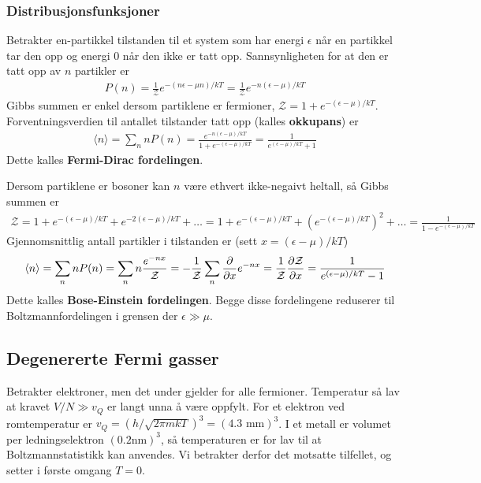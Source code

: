 \documentclass[12pt]{article}
\newcommand{\mean}[1]{\langle #1 \rangle}
\begin{document}
\subsubsection{Distribusjonsfunksjoner}
Betrakter en-partikkel tilstanden til et system som har energi $\epsilon$ når
en partikkel tar den opp og energi $0$ når den ikke er tatt opp. Sannsynligheten
for at den er tatt opp av $n$ partikler er
\begin{align*}
  P(n) = \frac{1}{\mathcal{Z}} e^{-(n\epsilon - \mu n)/kT} = \frac{1}{\mathcal{Z}} e^{-n(\epsilon - \mu)/kT}
\end{align*}
Gibbs summen er enkel dersom partiklene er fermioner, $\mathcal{Z} = 1 + e^{-(\epsilon - \mu)/kT}$.
Forventningsverdien til antallet tilstander tatt opp (kalles \textbf{okkupans}) er
\begin{align*}
  \mean{n} = \sum_n n P(n) = \frac{e^{-n(\epsilon - \mu)/kT}}{1 + e^{-(\epsilon - \mu)/kT}} = \frac{1}{e^{(\epsilon - \mu)/kT} + 1}
\end{align*}
Dette kalles \textbf{Fermi-Dirac fordelingen}.

Dersom partiklene er bosoner kan $n$ være ethvert ikke-negaivt heltall, så Gibbs summen er
\begin{align*}
  \mathcal{Z} = 1 + e^{-(\epsilon - \mu)/kT} + e^{-2(\epsilon - \mu)/kT} + \hdots = 1 + e^{-(\epsilon - \mu)/kT} + (e^{-(\epsilon - \mu)/kT})^2 + \hdots = \frac{1}{1-e^{-(\epsilon - \mu)/kT}}
\end{align*}
Gjennomsnittlig antall partikler i tilstanden er (sett $x = (\epsilon - \mu)/kT$)
\begin{align*}
  \mean{n} = \sum_n n P(n) = \sum_n n \frac{e^{-nx}}{\mathcal{Z}} = - \frac{1}{\mathcal{Z}} \sum_n \pdv{x} e^{-nx} = \frac{1}{\mathcal{Z}} \pdv{\mathcal{Z}}{x} = \frac{1}{e^{(\epsilon - \mu)/kT} - 1}
\end{align*}
Dette kalles \textbf{Bose-Einstein fordelingen}. Begge disse fordelingene reduserer til Boltzmannfordelingen
i grensen der $\epsilon \gg \mu$.
\subsection{Degenererte Fermi gasser}
Betrakter elektroner, men det under gjelder for alle fermioner. Temperatur så lav
at kravet $V/N \gg v_Q$ er langt unna å være oppfylt. For et elektron ved
romtemperatur er $v_Q = (h / \sqrt{2\pi m k T})^3 = (4.3 \text{ mm})^3$. I et metall
er volumet per ledningselektron $(0.2\text{nm})^3$, så temperaturen er for lav til
at Boltzmannstatistikk kan anvendes. Vi betrakter derfor det motsatte tilfellet,
og setter i første omgang $T = 0$.
\end{document}
